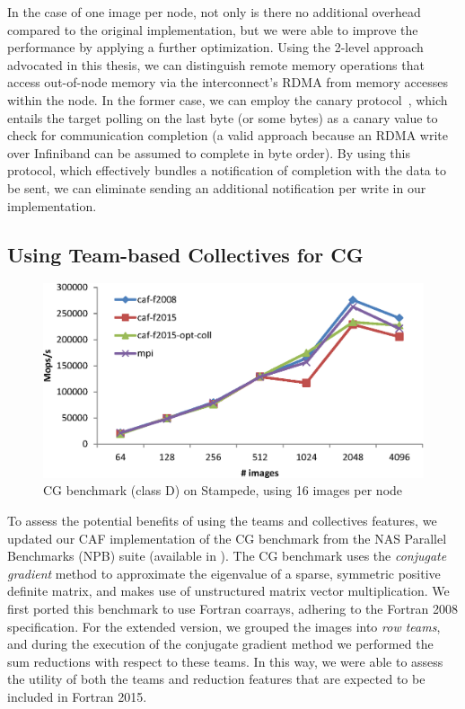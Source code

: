 In the case of one image per node, not only is there no additional overhead compared to
the original implementation, but we were able to improve the performance by
applying a further optimization. Using the 2-level approach advocated in this thesis, we can
distinguish remote memory operations that access out-of-node memory via the
interconnect's RDMA from memory accesses within the node. In the former case,
we can employ the canary protocol~\cite{canary}, which entails the target
polling on the last byte (or some bytes) as a canary value to check for
communication completion (a valid approach because an RDMA write over
Infiniband can be assumed to complete in byte order). By using this protocol,
which effectively bundles a notification of completion with the data to be
sent, we can eliminate sending an additional notification per write in our
implementation.\\

\subsection{Using Team-based Collectives for CG}
\begin{figure}[h]
\centering
\includegraphics[width=\columnwidth]{figures/stampede-caf-cg-D.eps}
\caption{CG benchmark (class D) on Stampede, using 16 images per node}
\label{fig:cg-stampede}
\end{figure}

To assess the potential benefits of using the teams and collectives features,
we updated our CAF implementation of the CG benchmark from the NAS Parallel
Benchmarks (NPB) suite (available in \cite{caf-testsuite}).
The CG benchmark uses the \textit{conjugate gradient} method to approximate
the eigenvalue of a sparse, symmetric positive definite matrix, and makes use
of unstructured matrix vector multiplication. We first ported this benchmark
to use Fortran coarrays, adhering to the Fortran 2008 specification. For the
extended version, we grouped the images into \textit{row teams}, and during
the execution of the conjugate gradient method we performed the sum reductions
with respect to these teams. In this way, we were able to assess the utility
of both the teams and reduction features that are expected to be included in
Fortran 2015.

